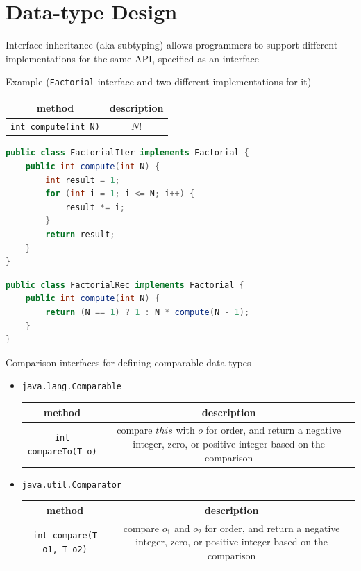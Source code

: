 \documentclass[8pt,a4paper,compress]{beamer}
\begin{document}
\section{Data-type Design}
\begin{frame}[fragile]
\pause

Interface inheritance (aka subtyping) allows programmers to support different implementations for the same API, specified as an interface

\pause
\bigskip

Example (\lstinline{Factorial} interface and two different implementations for it)
\begin{center}
\begin{tabular}{cc}
method & description \\ \hline
\lstinline$int compute(int N)$ & $N!$
\end{tabular} 
\end{center}

\begin{lstlisting}[language=Java]
public class FactorialIter implements Factorial {
    public int compute(int N) {
        int result = 1;
        for (int i = 1; i <= N; i++) {
            result *= i;
        }
        return result;
    }
}
\end{lstlisting}

\begin{lstlisting}[language=Java]
public class FactorialRec implements Factorial {
    public int compute(int N) {
        return (N == 1) ? 1 : N * compute(N - 1);
    }
}
\end{lstlisting}
\end{frame}

\begin{frame}[fragile]
\pause

Comparison interfaces for defining comparable data types
\begin{itemize}
\item \lstinline{java.lang.Comparable}
\begin{center}
\begin{tabular}{cc}
method & description \\ \hline
\lstinline$int compareTo(T o)$ & \makecell{compare $this$ with $o$ for order, and return a negative \\ integer, zero, or positive integer based on the comparison}
\end{tabular} 
\end{center}

\item \lstinline{java.util.Comparator}
\begin{center}
\begin{tabular}{cc}
method & description \\ \hline
\lstinline$int compare(T o1, T o2)$ & \makecell{compare $o_1$ and $o_2$ for order, and return a negative \\ integer, zero, or positive integer based on \\ the comparison}
\end{tabular} 
\end{center}
\end{itemize}
\end{frame}
\end{document}
